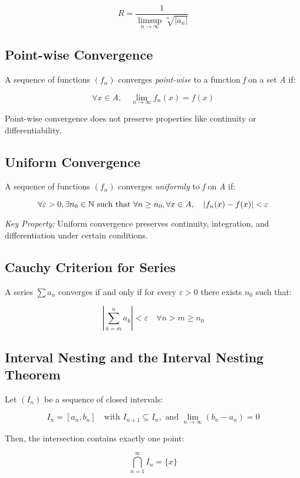 \[
    R = \frac{1}{\limsup\limits_{n \to \infty} \sqrt[n]{|a_n|}}
\]

\subsection{Point-wise Convergence}

A sequence of functions \((f_n)\) converges \emph{point-wise} to a function \emph{f} on a set \emph{A} if:

\[
    \forall x \in A, \quad \lim_{n \to \infty} f_n(x) = f(x)
\]

Point-wise convergence does not preserve properties like continuity or differentiability.

\subsection{Uniform Convergence}

A sequence of functions \((f_n)\) converges \emph{uniformly} to \emph{f} on \emph{A} if:

\[
    \forall \varepsilon > 0, \exists n_0 \in \mathbb{N} \text{ such that } \forall n \ge n_0, \forall x \in A, \quad |f_n(x) - f(x)| < \varepsilon
\]

\emph{Key Property:} Uniform convergence preserves continuity, integration, and differentiation under 
certain conditions.

\subsection{Cauchy Criterion for Series}

A series \(\sum a_n\) converges if and only if for every \(\varepsilon > 0\) there exists \(n_0\) 
such that:

\[
    \left| \sum_{k = m}^{n} a_k \right| < \varepsilon \quad \forall n > m \ge n_0
\]

\subsection{Interval Nesting and the Interval Nesting Theorem}

Let \((I_n)\) be a sequence of closed intervals:

\[
    I_n = [a_n, b_n] \quad \text{with } I_{n+1} \subseteq I_n, \text{ and } \lim_{n \to \infty} (b_n - a_n) = 0
\]

Then, the intersection contains exactly one point:

\[
    \bigcap_{n=1}^{\infty} I_n = \{x\}
\]

